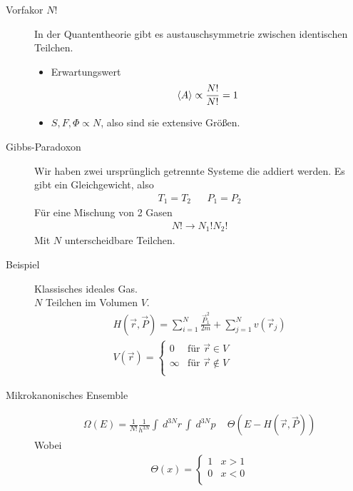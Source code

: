 \documentclass[11pt]{article}
\theoremstyle{plain}
\theoremstyle{mytheoremstyle}
\renewcommand{\d}[1]{\,d#1\,}
\begin{document}
\begin{description}
  \item[Vorfakor $N!$] 
    In der Quantentheorie gibt es austauschsymmetrie zwischen identischen
    Teilchen.
    \begin{itemize}
      \item Erwartungswert
        \begin{align*}
          \Braket{A} \propto \frac{N!}{N!} = 1
        \end{align*}
      \item $S, F, \Phi \propto N$, also sind sie extensive Gr\"o\ss{}en.
    \end{itemize}
  \item[Gibbs-Paradoxon]
    Wir haben zwei urspr\"unglich getrennte Systeme die addiert werden.
    Es gibt ein Gleichgewicht, also 
    \begin{align*}
      T_1 = T_2 && P_1 = P_2
    \end{align*}
    F\"ur eine Mischung von 2 Gasen 
    \begin{align*}
      N! \to N_1! N_2!
    \end{align*}
    Mit $N$ unterscheidbare Teilchen.
  \item [Beispiel] Klassisches ideales Gas. \\
    $N$ Teilchen im Volumen $V$.
    \begin{align*}
      H(\vec{r}, \vec{P}) = \sum_{i=1}^{ N} \frac{\vec{P}_1 ^2}{ 2m}
      + \sum_{j = 1}^{ N} v(\vec{r}_j) \\
      V(\vec{r}) = 
      \begin{cases}
        0 & \text{f\"ur } \vec{r} \in V \\
        \infty & \text{f\"ur } \vec{r} \not\in V \\
      \end{cases}
    \end{align*}
%
    \item[Mikrokanonisches Ensemble]
      \begin{align*}
        \Omega(E) = \frac{1}{N!} \frac{1}{h^{3N}} \int_{}^{} \d{^{3N} r}
        \int_{}^{} \d{^{3N} p} \quad \Theta(E - H(\vec{r}, \vec{P}))
      \end{align*}
      Wobei
      \begin{align*}
        \Theta(x) = \begin{cases}
          1 & x>1 \\
          0 & x <0 \\

\end{cases}
\end{align*}
\end{description}
\end{document}
